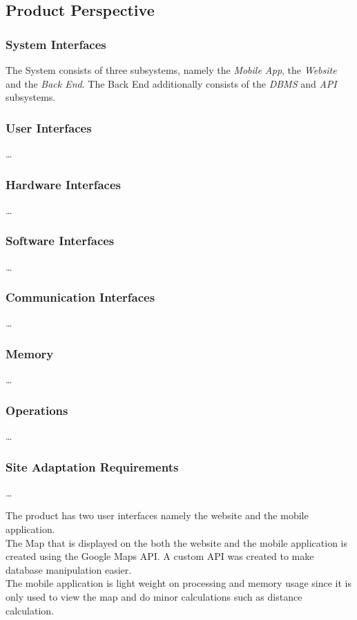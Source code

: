 \documentclass{article}
\begin{document}
    \subsection{Product Perspective}

    \subsubsection{System Interfaces}
    The System consists of three subsystems, namely the \textit{Mobile App},
    the \textit{Website} and the \textit{Back End}. The Back End additionally
    consists of the \textit{DBMS} and \textit{API} subsystems.

    \subsubsection{User Interfaces}
    \ldots

    \subsubsection{Hardware Interfaces}
    \ldots

    \subsubsection{Software Interfaces}
    \ldots

    \subsubsection{Communication Interfaces}
    \ldots

    \subsubsection{Memory}
    \ldots

    \subsubsection{Operations}
    \ldots

    \subsubsection{Site Adaptation Requirements}
    \ldots

    The product has two user interfaces namely the website and the mobile
    application.\\ The Map that is displayed on the both the website and the
    mobile application is created using the Google Maps API. A custom API was
    created to make database manipulation easier.\\ The mobile application is
    light weight on processing and memory usage since it is only used to view
    the map and do minor calculations such as distance calculation.
\end{document}

